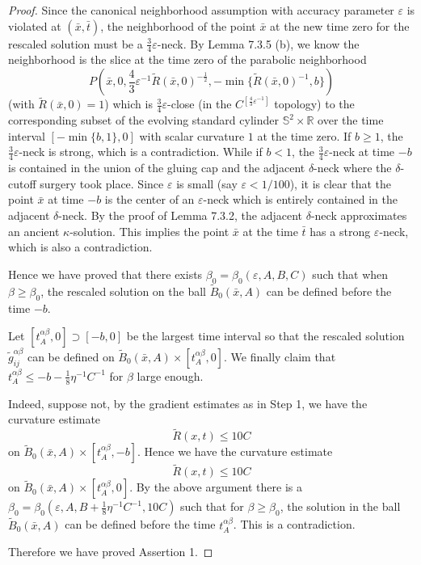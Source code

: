 \begin{proof}
Since the canonical neighborhood assumption with accuracy
parameter $\varepsilon$ is violated at $(\bar{x},\bar{t})$, the
neighborhood of the point $\bar{x}$ at the new time zero for the
rescaled solution must be a $\frac{3}{4}\varepsilon$-neck. By
Lemma 7.3.5 (b), we know the neighborhood is the slice at the time
zero of the parabolic neighborhood
$$
P(\bar{x},0,\frac{4}{3}\varepsilon^{-1}\widetilde{R}
(\bar{x},0)^{-\frac{1}{2}},
-\min\{\widetilde{R}(\bar{x},0)^{-1},b\})
$$
(with $\widetilde{R}(\bar{x},0)=1$) which is
$\frac{3}{4}\varepsilon$-close (in the
$C^{[\frac{4}{3}\varepsilon^{-1}]}$ topology) to the corresponding
subset of the evolving standard cylinder $\mathbb{S}^2 \times
\mathbb{R}$ over the time interval $[-\min \{b,1\},0]$ with scalar
curvature $1$ at the time zero. If $b \geq 1$, the
$\frac{3}{4}\varepsilon$-neck is strong, which is a contradiction.
While if $b<1$, the $\frac{3}{4}\varepsilon$-neck at time $-b$ is
contained in the union of the gluing cap and the adjacent
$\delta$-neck where the $\delta$-cutoff surgery took place. Since
$\varepsilon$ is small (say $\varepsilon< 1/100$), it is clear
that the point $\bar{x}$ at time $-b$ is the center of an
$\varepsilon$-neck which is entirely contained in the adjacent
$\delta$-neck. By the proof of Lemma 7.3.2, the adjacent
$\delta$-neck approximates an ancient $\kappa$-solution. This
implies the point $\bar{x}$ at the time $\bar{t}$ has a strong
$\varepsilon$-neck, which is also a contradiction.

Hence we have proved that there exists $\beta_0=\beta_0(
\varepsilon, A, B, C)$ such that when $\beta\geq\beta_0$, the
rescaled solution on the ball $\widetilde{B}_{0}(\bar{x},A)$ can
be defined before the time $-b$.

Let $[t_{A}^{\alpha\beta},0]\supset[-b,0]$ be the largest time
interval so that the rescaled solution
$\widetilde{g}^{\alpha\beta}_{ij}$ can be defined on
$\widetilde{B}_{0}(\bar{x},A)\times[t_{A}^{\alpha\beta},0]$. We
finally claim that $t_{A}^{\alpha\beta}\le
-b-\frac{1}{8}\eta^{-1}C^{-1}$ for $\beta$ large enough.

Indeed, suppose not, by the gradient estimates as in Step 1, we
have the curvature estimate
$$
\widetilde{R}(x,t)\leq {10C}
$$
on $\widetilde{B}_{0}(\bar{x},A)\times [t_{A}^{\alpha\beta},-b]$.
Hence we have the curvature estimate
$$
\widetilde{R}(x,t)\leq {10C}
$$
on $\widetilde{B}_{0}(\bar{x},A)\times [t_{A}^{\alpha\beta},0]$.
By the above argument there is a $\beta_0=\beta_0( \varepsilon, A,
B + \frac{1}{8}\eta^{-1}C^{-1}, 10C)$ such that for
$\beta\geq\beta_0$, the solution in the ball
$\widetilde{B}_{0}(\bar{x},A)$ can be defined before the time
$t_{A}^{\alpha\beta}$. This is a contradiction.

Therefore we have proved Assertion 1.
\end{proof}

